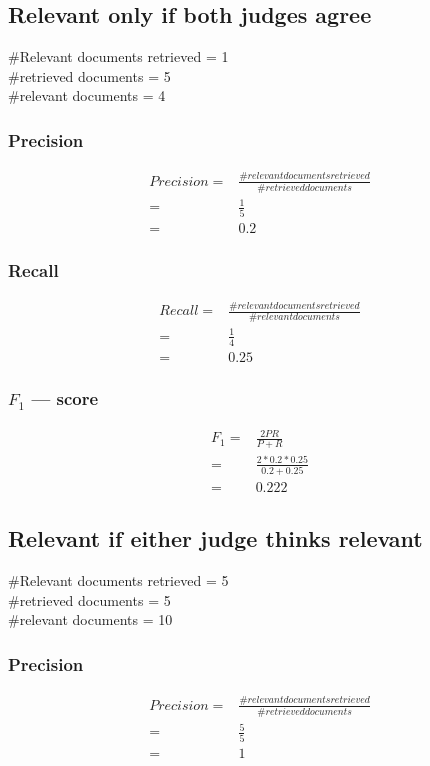 \documentclass{article}
\begin{document}
\subsection{Relevant only if both judges agree}
\#Relevant documents retrieved = 1 \\
\#retrieved documents = 5 \\
\#relevant documents = 4 \\
\subsubsection{Precision}
\begin{align*}
  Precision =& \frac{\#relevant documents retrieved}{\#retrieved documents} \\
  =& \frac{1}{5} \\
  =& 0.2
\end{align*}

\subsubsection{Recall}
\begin{align*}
  Recall =& \frac{\#relevant documents retrieved}{\#relevant documents}\\
  =& \frac{1}{4} \\
  =& 0.25
\end{align*}

\subsubsection{$F_{1}$ --- score}
\begin{align*}
  F_{1} =& \frac{2PR}{P+R} \\
  =& \frac{2*0.2*0.25}{0.2+0.25} \\
  =& 0.222
\end{align*}

\subsection{Relevant if either judge thinks relevant}
\#Relevant documents retrieved = 5 \\
\#retrieved documents = 5 \\
\#relevant documents = 10 \\

\subsubsection{Precision}
\begin{align*}
  Precision =& \frac{\#relevant documents retrieved}{\#retrieved documents} \\
  =& \frac{5}{5} \\
  =& 1
\end{align*}
\end{document}
